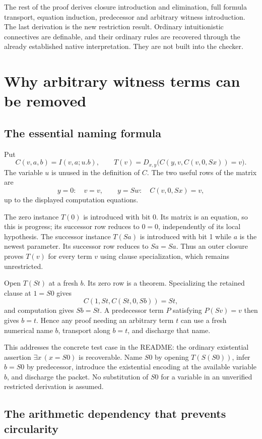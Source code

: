 \documentclass[11pt,letterpaper]{article}
\theoremstyle{definition}
\theoremstyle{remark}
\begin{document}
The rest of the proof derives closure introduction and elimination,
full formula transport, equation induction, predecessor and arbitrary
witness introduction. The last derivation is the new restriction result.
Ordinary intuitionistic connectives are definable, and their ordinary
rules are recovered through the already established native interpretation.
They are not built into the checker.

\section{Why arbitrary witness terms can be removed}

\subsection{The essential naming formula}

Put
\[
 C(v,a,b)=I(v,a;u.b),\qquad
 T(v)=D_{x,y}\bigl(C(y,v,C(v,0,Sx))=v\bigr).
 \tag{Packet}
\]
The variable $u$ is unused in the definition of $C$. The two useful
rows of the matrix are
\[
 y=0:\quad v=v,
 \qquad y=Sw:\quad C(v,0,Sx)=v,
\]
up to the displayed computation equations.

The zero instance $T(0)$ is introduced with bit 0. Its matrix is an
equation, so this is progress; its successor row reduces to $0=0$,
independently of its local hypothesis. The successor instance $T(Sa)$
is introduced with bit 1 while $a$ is the newest parameter. Its successor
row reduces to $Sa=Sa$. Thus an outer closure proves $T(v)$ for every
term $v$ using clause specialization, which remains unrestricted.

Open $T(St)$ at a fresh $b$. Its zero row is a theorem. Specializing
the retained clause at $1=S0$ gives
\[
 C(1,St,C(St,0,Sb))=St,
\]
and computation gives $Sb=St$. A predecessor term $P$ satisfying
$P(Sv)=v$ then gives $b=t$. Hence any proof needing an arbitrary term
$t$ can use a fresh numerical name $b$, transport along $b=t$, and
discharge that name.

This addresses the concrete test case in the README: the ordinary
existential assertion $\exists x\,(x=S0)$ is recoverable. Name $S0$
by opening $T(S(S0))$, infer $b=S0$ by predecessor, introduce the
existential encoding at the available variable $b$, and discharge the
packet. No substitution of $S0$ for a variable in an unverified
restricted derivation is assumed.

\subsection{The arithmetic dependency that prevents circularity}
\end{document}
